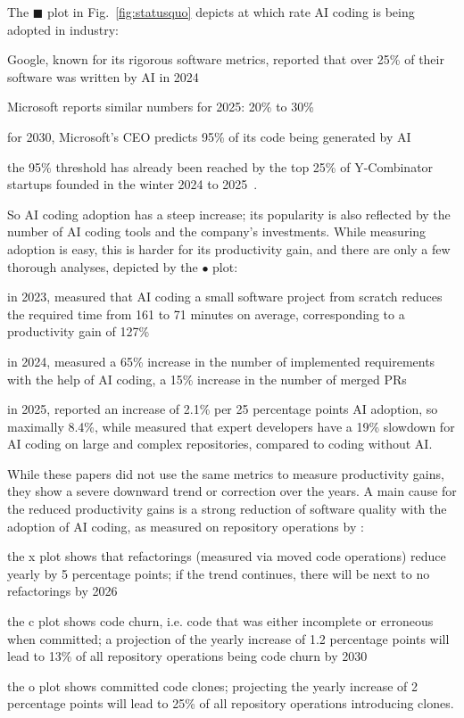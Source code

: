 \documentclass[twocolumn]{article}
\begin{document}
The {\color{blue}$\blacksquare$} plot in Fig.~\ref{fig:statusquo} depicts
at which rate AI coding is being adopted in industry:
\begin{compactitem}
\item Google, known for its rigorous software metrics,
  reported that over 25\% of their software was written by AI in 2024~\cite{RA24}
\item Microsoft reports similar numbers for 2025: 20\% to 30\%~\cite{MZ25}
\item for 2030, Microsoft's CEO predicts 95\% of its code being generated by AI~\cite{MG25}
\item the 95\% threshold has already been reached by the top 25\% of Y-Combinator startups
  founded in the winter 2024 to 2025~\cite{IM25}.
\end{compactitem}
So AI coding adoption has a steep increase; its popularity is also reflected by the number of AI coding tools and the company's investments. 
While measuring adoption is easy, this is harder for its productivity gain, and there are only a few thorough analyses, depicted by the {\color{green}$\bullet$} plot:
\begin{compactitem}
\item in 2023, \cite{peng23} measured that AI coding a small software project from scratch
  reduces the required time from 161 to 71 minutes on average, corresponding to a productivity gain of 127\%
\item in 2024, \cite{TW24} measured a 65\% increase in the number of implemented requirements with the help of AI coding,
  \cite{KC24} a 15\% increase in the number of merged PRs
\item in 2025, \cite{DORA25} reported an increase of 2.1\% per 25 percentage points AI adoption, so maximally 8.4\%, while
  \cite{JB25} measured that expert developers have a 19\% slowdown for AI coding on large and complex repositories,
  compared to coding without AI.
\end{compactitem}
While these papers did not use the same metrics to measure productivity gains,
they show a severe downward trend or correction over the years.
A main cause for the reduced productivity gains is a strong reduction of software quality
with the adoption of AI coding, as measured on repository operations by \cite{WH25}:
\begin{compactitem}
\item the {\color{orange}x} plot shows that refactorings (measured via moved code operations) reduce yearly by 5 percentage points; if the trend continues, there will be next to no refactorings by 2026
\item the {\color{red}c} plot shows code churn, i.e. code that was either incomplete or erroneous when committed; a projection of the yearly increase of 1.2 percentage points will lead to 13\% of all repository operations being code churn by 2030
\item the {\color{purple}o} plot shows committed code clones; projecting the yearly increase of 2 percentage points will lead to 25\% of all repository operations introducing clones.
\end{compactitem}
\end{document}
